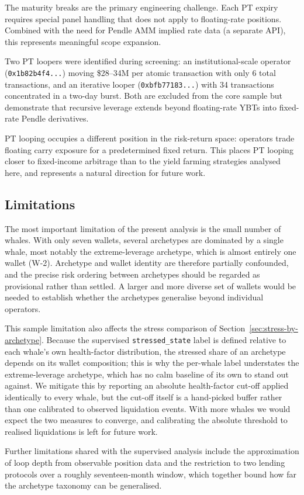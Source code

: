 The maturity breaks are the primary engineering challenge. Each PT expiry requires special panel handling that does not apply to floating-rate positions. Combined with the need for Pendle AMM implied rate data (a separate API), this represents meaningful scope expansion.

Two PT loopers were identified during screening: an institutional-scale operator (\texttt{0x1b82b4f4...}) moving \$28--34M per atomic transaction with only 6 total transactions, and an iterative looper (\texttt{0xbfb77183...}) with 34 transactions concentrated in a two-day burst. Both are excluded from the core sample but demonstrate that recursive leverage extends beyond floating-rate YBTs into fixed-rate Pendle derivatives.

PT looping occupies a different position in the risk-return space: operators trade floating carry exposure for a predetermined fixed return. This places PT looping closer to fixed-income arbitrage than to the yield farming strategies analysed here, and represents a natural direction for future work.

\subsection{Limitations}

The most important limitation of the present analysis is the small number
of whales. With only seven wallets, several archetypes are dominated by a
single whale, most notably the extreme-leverage archetype, which is almost
entirely one wallet (W-2). Archetype and wallet identity are therefore
partially confounded, and the precise risk ordering between archetypes
should be regarded as provisional rather than settled. A larger and more
diverse set of wallets would be needed to establish whether the archetypes
generalise beyond individual operators.

This sample limitation also affects the stress comparison of
Section~\ref{sec:stress-by-archetype}. Because the supervised
\texttt{stressed\_state} label is defined relative to each whale's own
health-factor distribution, the stressed share of an archetype depends on
its wallet composition; this is why the per-whale label understates the
extreme-leverage archetype, which has no calm baseline of its own to stand
out against. We mitigate this by reporting an absolute health-factor
cut-off applied identically to every whale, but the cut-off itself is a
hand-picked buffer rather than one calibrated to observed liquidation
events. With more whales we would expect the two measures to converge, and
calibrating the absolute threshold to realised liquidations is left for
future work.

Further limitations shared with the supervised analysis include the
approximation of loop depth from observable position data and the
restriction to two lending protocols over a roughly seventeen-month window,
which together bound how far the archetype taxonomy can be generalised.
